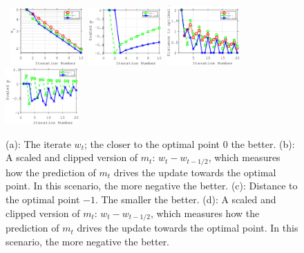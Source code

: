 \documentclass[11pt]{article}
\theoremstyle{k}
\begin{document}
\begin{figure}[H]
\centering
    \mbox{
    \includegraphics[width=0.25\textwidth]{simulation/fig/fig1_left.eps}
    \includegraphics[width=0.25\textwidth]{simulation/fig/fig1_right.eps}
    \includegraphics[width=0.25\textwidth]{simulation/fig/fig2_left.eps}
    \includegraphics[width=0.25\textwidth]{simulation/fig/fig2_right.eps}
    }
     \caption{\small (a): The iterate $w_t$; the closer to the optimal point $0$ the better. (b): A scaled and clipped version of $m_t$: $w_t - w_{t-1/2}$, which measures how the prediction of $m_t$ drives the update towards the optimal point. In this scenario, the more negative the better.
     (c): Distance to the optimal point $-1$. The smaller the better. (d): A scaled and clipped version of $m_t$: $w_t - w_{t-1/2}$, which measures how the prediction of $m_t$ drives
the update towards the optimal point. In this scenario, the more negative the better.
     }
     \label{simu}
\vspace{-0.2in}
\end{figure}
\end{document}
